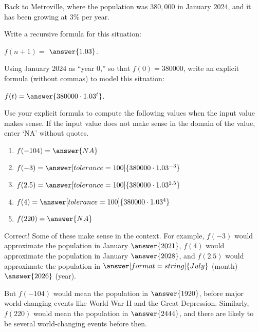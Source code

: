 \documentclass[nooutcomes]{ximera}
\begin{document}
\begin{problem}
Back to Metroville, where the population was $380,\!000$ in January $2024$, and it has been growing at $3\%$ per year.  

Write a recursive formula for this situation:  

\begin{prompt}
$f(n+1) =$ 
\wordChoice{\choice{$+$}\choice{$-$}\choice[correct]{$\times$}\choice{$\div$}\choice{$\wedge$}}$\answer{1.03}$.
\end{prompt}
\begin{problem}
Using January 2024 as ``year 0,'' so that $f(0)=380000$,  write an explicit formula (without commas) to model this situation: 
\begin{prompt}
$f(t) = \answer{380000\cdot 1.03^t}$.
\end{prompt}

\begin{problem}
Use your explicit formula to compute the following values when the input value makes sense.  If the input value does not make sense in the domain of the value, enter `NA' without quotes.
\begin{enumerate}
\item $f(-104) = \answer{NA}$
\item $f(-3) = \answer[tolerance=100]{380000\cdot 1.03^{-3}}$
\item $f(2.5) = \answer[tolerance=100]{380000\cdot 1.03^{2.5}}$
\item $f(4) = \answer[tolerance=100]{380000\cdot 1.03^4}$
\item $f(220) = \answer{NA}$
\end{enumerate}
\begin{problem}
Correct!  Some of these make sense in the context.  For example, $f(-3)$ would approximate the population in January $\answer{2021}$, $f(4)$ would approximate the population in January $\answer{2028}$, and $f(2.5)$ would approximate the population in $\answer[format=string]{July}$ (month) $\answer{2026}$ (year).  

But $f(-104)$ would mean the population in $\answer{1920}$, before major world-changing events like World War II and the Great Depression.  Similarly, $f(220)$ would mean the population in $\answer{2444}$, and there are likely to be several world-changing events before then.  

\end{problem}

\end{problem}
\end{problem}

\end{problem}
\end{document}
